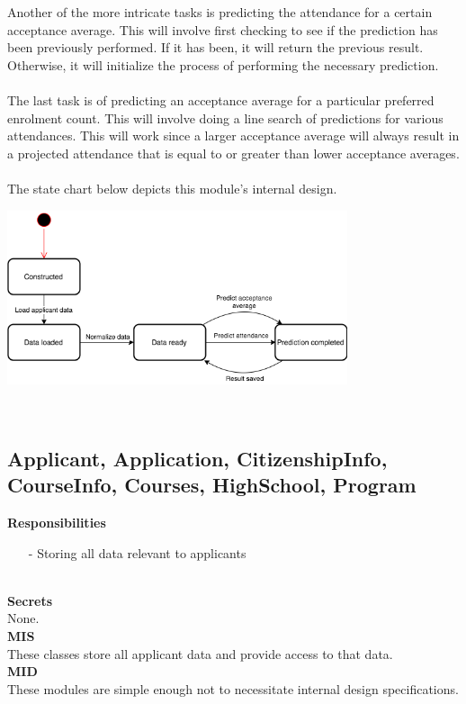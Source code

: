 \documentclass[titlepage]{article}
\begin{document}
Another of the more intricate tasks is predicting the attendance for a certain acceptance average. This will involve first checking to see if the prediction has been previously performed. If it has been, it will return the previous result. Otherwise, it will initialize the process of performing the necessary prediction.\\~\\
The last task is of predicting an acceptance average for a particular preferred enrolment count. This will involve doing a line search of predictions for various attendances. This will work since a larger acceptance average will always result in a projected attendance that is equal to or greater than lower acceptance averages.\\~\\
The state chart below depicts this module's internal design.\\
\begin{center}
	\includegraphics[width=0.75\textwidth]{AdvolWorkingMemoryStateChart.png}
\label{fig:workingmemory state chart}
\end{center}~\\

\newpage
\subsection{Applicant, Application, CitizenshipInfo, CourseInfo, Courses, HighSchool, Program}
\textbf{Responsibilities}
\begin{itemize}
	\item[-] Storing all data relevant to applicants
\end{itemize}~\\
\textbf{Secrets}\\[2mm]
\indent None.\\[6mm]
\textbf{MIS}\\[2mm]
These classes store all applicant data and provide access to that data.\\[6mm]
\textbf{MID}\\[2mm]
These modules are simple enough not to necessitate internal design specifications.
\end{document}
